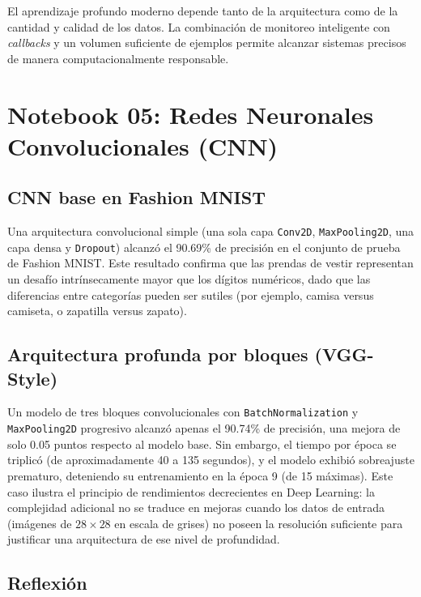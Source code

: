 \documentclass[12pt, a4paper]{article}
\begin{document}
El aprendizaje profundo moderno depende tanto de la arquitectura como de la cantidad y calidad de los datos. La combinación de monitoreo inteligente con \textit{callbacks} y un volumen suficiente de ejemplos permite alcanzar sistemas precisos de manera computacionalmente responsable.

\section{Notebook 05: Redes Neuronales Convolucionales (CNN)}

\subsection{CNN base en Fashion MNIST}

Una arquitectura convolucional simple (una sola capa \texttt{Conv2D}, \texttt{MaxPooling2D}, una capa densa y \texttt{Dropout}) alcanzó el 90.69\% de precisión en el conjunto de prueba de Fashion MNIST. Este resultado confirma que las prendas de vestir representan un desafío intrínsecamente mayor que los dígitos numéricos, dado que las diferencias entre categorías pueden ser sutiles (por ejemplo, camisa versus camiseta, o zapatilla versus zapato).

\subsection{Arquitectura profunda por bloques (VGG-Style)}

Un modelo de tres bloques convolucionales con \texttt{BatchNormalization} y \texttt{MaxPooling2D} progresivo alcanzó apenas el 90.74\% de precisión, una mejora de solo 0.05 puntos respecto al modelo base. Sin embargo, el tiempo por época se triplicó (de aproximadamente 40 a 135 segundos), y el modelo exhibió sobreajuste prematuro, deteniendo su entrenamiento en la época 9 (de 15 máximas). Este caso ilustra el principio de rendimientos decrecientes en Deep Learning: la complejidad adicional no se traduce en mejoras cuando los datos de entrada (imágenes de $28 \times 28$ en escala de grises) no poseen la resolución suficiente para justificar una arquitectura de ese nivel de profundidad.

\subsection{Reflexión}
\end{document}
